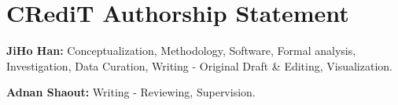 \section*{CRediT Authorship Statement} \label{credit}
\textbf{JiHo Han:} Conceptualization, Methodology, Software, Formal analysis, Investigation, Data Curation, Writing - Original Draft \& Editing, Visualization. 

\textbf{Adnan Shaout:} Writing - Reviewing, Supervision.
